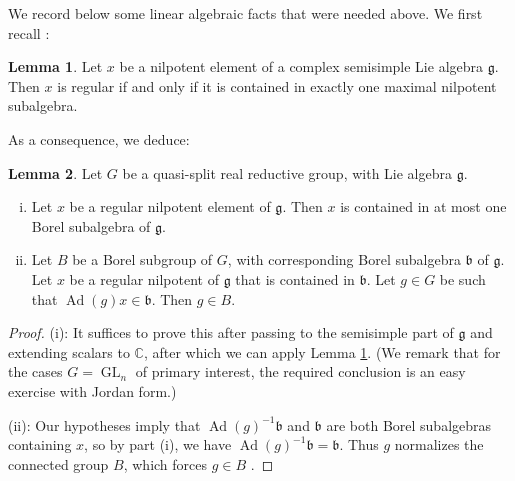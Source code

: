 \documentclass[reqno]{amsart}
\DeclareMathOperator{\GL}{GL}
\DeclareMathOperator{\Ad}{Ad}
\theoremstyle{plain} \newtheorem{theorem} {Theorem}
\theoremstyle{definition} \newtheorem{definition} [theorem] {Definition}
\theoremstyle{itplain} %
\newtheorem{lemma}[theorem]{Lemma}
\numberwithin{equation}{section}
\numberwithin{theorem}{section}
\begin{document}
We record below some linear algebraic facts that were needed above.  We first recall
\cite[Cor 5.6]{MR0114875}:
\begin{lemma}\label{lem:kostant-regular-nilpotent}
  Let $x$ be a nilpotent element of a complex semisimple Lie algebra $\mathfrak{g}$.  Then $x$ is regular if and only if it is contained in exactly one maximal nilpotent subalgebra.
\end{lemma}
As a consequence, we deduce:
\begin{lemma}\label{lem:scratch-research:let-mathfrakb-be}
  Let $G$ be a quasi-split real reductive group, with Lie algebra $\mathfrak{g}$.
  \begin{enumerate}[(i)]
  \item \label{itm:scratch-research:lemma-general-linear-remedial} Let $x$ be a regular nilpotent element of $\mathfrak{g}$.  Then $x$ is contained in at most one Borel subalgebra of $\mathfrak{g}$.
  \item Let $B$ be a Borel subgroup of $G$, with corresponding Borel subalgebra $\mathfrak{b}$ of $\mathfrak{g}$.  Let $x$ be a regular nilpotent of $\mathfrak{g}$ that is contained in $\mathfrak{b}$.  Let $g \in G$ be such that $\Ad(g) x \in \mathfrak{b}$.  Then $g \in B$.
  \end{enumerate}
\end{lemma}
\begin{proof}
  (i): It suffices to prove this after passing to the semisimple part of $\mathfrak{g}$ and extending scalars to $\mathbb{C}$, after which we can apply Lemma \ref{lem:kostant-regular-nilpotent}.  (We remark that for the cases $G = \GL_n$ of primary interest, the required conclusion is an easy exercise with Jordan form.)
  

  (ii): Our hypotheses imply that $\Ad(g)^{-1} \mathfrak{b}$ and $\mathfrak{b}$ are both Borel subalgebras containing $x$, so by part (i), we have $\Ad(g)^{-1} \mathfrak{b} = \mathfrak{b}$.  Thus $g$ normalizes the connected group $B$, which forces $g \in B$ \cite[Thm 11.16]{MR1102012}.
\end{proof}
\end{document}
